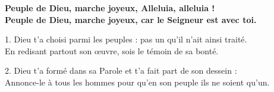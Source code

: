 \textbf{
Peuple de Dieu, marche joyeux, Alleluia, alleluia !\\
Peuple de Dieu, marche joyeux, car le Seigneur est avec toi.}

1. Dieu t’a choisi parmi les peuples : pas un qu’il n’ait ainsi traité.\\
En redisant partout son œuvre, sois le témoin de sa bonté.

2. Dieu t’a formé dans sa Parole et t’a fait part de son dessein :\\
Annonce-le à tous les hommes pour qu’en son peuple ils ne soient qu’un.

